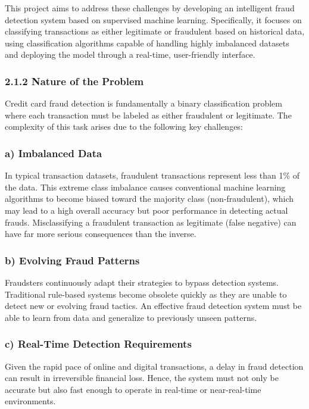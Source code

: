 \documentclass[11pt,a4paper]{article}
\begin{document}
This project aims to address these challenges by developing an intelligent fraud detection system based on 
supervised machine learning. Specifically, it focuses on classifying transactions as either legitimate or 
fraudulent based on historical data, using classification algorithms capable of handling highly imbalanced 
datasets and deploying the model through a real-time, user-friendly interface. 

\subsubsection*{2.1.2 Nature of the Problem }

Credit card fraud detection is fundamentally a binary classification problem where each transaction must be 
labeled as either fraudulent or legitimate. The complexity of this task arises due to the following key 
challenges: 

\subsubsection*{a) Imbalanced Data }

In typical transaction datasets, fraudulent transactions represent less than 1\% of the data. This extreme class 
imbalance causes conventional machine learning algorithms to become biased toward the majority class 
(non-fraudulent), which may lead to a high overall accuracy but poor performance in detecting actual frauds. 
Misclassifying a fraudulent transaction as legitimate (false negative) can have far more serious consequences 
than the inverse. 

\subsubsection*{b) Evolving Fraud Patterns }

Fraudsters continuously adapt their strategies to bypass detection systems. Traditional rule-based systems 
become obsolete quickly as they are unable to detect new or evolving fraud tactics. An effective fraud 
detection system must be able to learn from data and generalize to previously unseen patterns. 

\subsubsection*{c) Real-Time Detection Requirements }

Given the rapid pace of online and digital transactions, a delay in fraud detection can result in irreversible 
financial loss. Hence, the system must not only be accurate but also fast enough to operate in real-time or 
near-real-time environments. 
\end{document}
